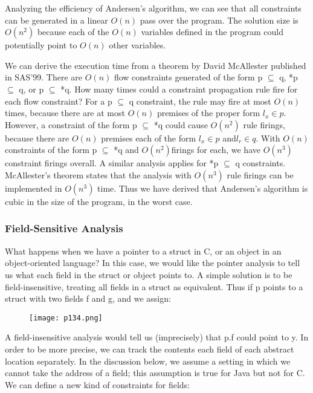 Analyzing the efficiency of Andersen’s algorithm, we can see that all
constraints can be generated in a linear $O(n)$ pass over the program.
The solution size is $O(n^2)$ because each of the $O(n)$
variables defined in the program could potentially point to $O(n)$ other variables.


We can derive the execution time from a theorem by David McAllester published in SAS’99.
There are $O(n)$ flow constraints generated of the form
p $\subseteq$ q, *p $\subseteq$ q, or p $\subseteq$ *q. How many
times could a constraint propagation rule fire for each flow constraint?
For a p $\subseteq$ q constraint,
the rule may fire at most $O(n)$ times, because there are at most $O(n)$ premises of the proper form
$l_x \in p$. However, a constraint of the form p $\subseteq$ *q could cause
$O(n^2)$ rule firings, because there
are $O(n)$ premises each of the form $l_x \in p$ and$l_r \in q$.
With $O(n)$ constraints of the form p $\subseteq$ *q
and $O(n^2)$firings for each, we have $O(n^3)$ constraint firings overall.
A similar analysis applies for
*p $\subseteq$ q constraints. McAllester’s theorem states that the analysis with $O(n^3)$ rule firings can be
implemented in $O(n^3)$ time. Thus we have derived that Andersen’s algorithm is cubic in the size
of the program, in the worst case.



\subsubsection{Field-Sensitive Analysis}

What happens when we have a pointer to a struct in C, or an object in an object-oriented language?
In this case, we would like the pointer analysis to tell us what each field in the struct or object
points to. A simple solution is to be field-insensitive, treating all fields in a struct as equivalent.
Thus if p points to a struct with two fields f and g, and we assign:

\begin{figure}[H]
	\centering
	\texttt{[image: p134.png]}
	\caption{}
	\label{fig:p134}
\end{figure}


A field-insensitive analysis would tell us (imprecisely) that p.f could point to y. In order
to be more precise, we can track the contents each field of each abstract location separately. In
the discussion below, we assume a setting in which we cannot take the address of a field; this
assumption is true for Java but not for C. We can define a new kind of constraints for fields:


